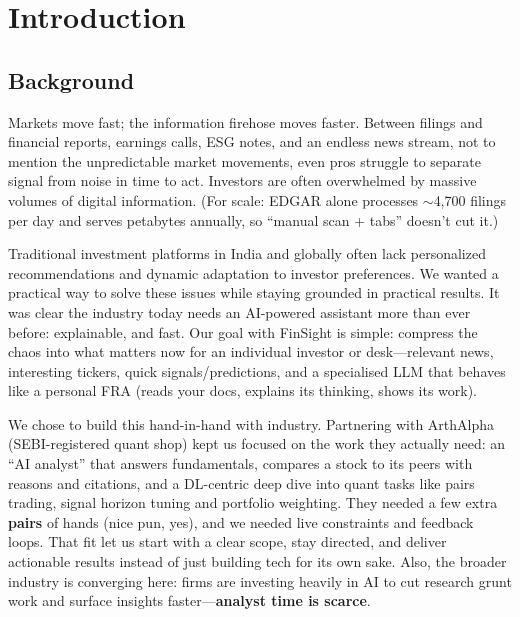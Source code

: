 \chapter{Introduction}




\section{Background} %

Markets move fast; the information firehose moves faster. Between filings and financial reports, earnings calls, \acf{ESG} notes, and an endless news stream, not to mention the unpredictable market movements, even pros struggle to separate signal from noise in time to act. Investors are often overwhelmed by massive volumes of digital information. (For scale: \acs{EDGAR} alone processes \(\sim\)4,700 filings per day and serves petabytes annually, so “manual scan + tabs” doesn’t cut it.) 

Traditional investment platforms in India and globally often lack personalized recommendations and dynamic adaptation to investor preferences. We wanted a practical way to solve these issues while staying grounded in practical results. It was clear the industry today needs an AI-powered assistant more than ever before: explainable, and fast. Our goal with FinSight is simple: compress the chaos into what matters now for an individual investor or desk---relevant news, interesting tickers, quick signals/predictions, and a specialised \acs{LLM} that behaves like a personal \acf{FRA} (reads your docs, explains its thinking, shows its work). 

We chose to build this hand-in-hand with industry. Partnering with ArthAlpha (\acs{SEBI}-registered quant shop) kept us focused on the work they actually need: an “AI analyst” that answers fundamentals, compares a stock to its peers with reasons and citations, and a \ac{DL}-centric deep dive into quant tasks like pairs trading, signal horizon tuning and portfolio weighting. They needed a few extra \textbf{pairs} of hands (nice pun, yes), and we needed live constraints and feedback loops. That fit let us start with a clear scope, stay directed, and deliver actionable results instead of just building tech for its own sake. Also, the broader industry is converging here: firms are investing heavily in AI to cut research grunt work and surface insights faster---\textbf{analyst time is scarce}.

